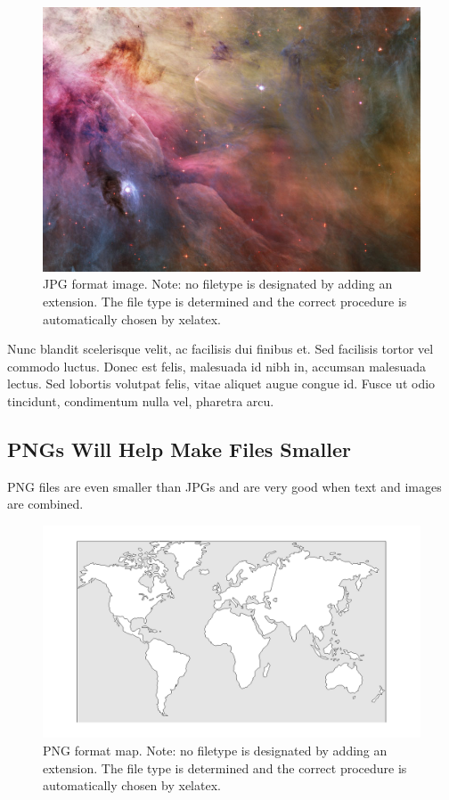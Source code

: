 \begin{figure}[htbp]
  \centering
    \includegraphics[width=5in]{images/nebula}
    \caption[JPG format image. Note: no filetype is designated by adding an extension.]{JPG format image. Note: no filetype is designated by adding an extension. The file type is determined and the correct procedure is automatically chosen by xelatex.}
\end{figure}

Nunc blandit scelerisque velit, ac facilisis dui finibus et. Sed facilisis tortor vel commodo luctus. Donec est felis, malesuada id nibh in, accumsan malesuada lectus. Sed lobortis volutpat felis, vitae aliquet augue congue id. Fusce ut odio tincidunt, condimentum nulla vel, pharetra arcu.

\subsection{PNGs Will Help Make Files Smaller}

PNG files are even smaller than JPGs and are very good when text and images are combined.

\begin{figure}[htbp]
  \centering
    \includegraphics[width=5in]{images/theworld}
    \caption[PNG format map. Note: no filetype is designated by adding an extension.]{PNG format map. Note: no filetype is designated by adding an extension. The file type is determined and the correct procedure is automatically chosen by xelatex.}
\end{figure}



